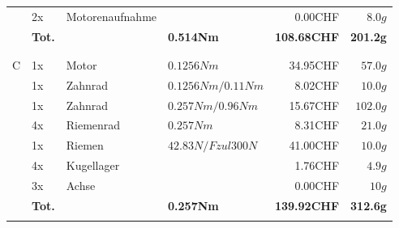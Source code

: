 \begin{longtable}{p{0.5cm}p{0.8cm}lp{3cm}rr}
          & 2x    & Motorenaufnahme &                      & 0.00CHF  & $8.0 g$  \\
          & \textbf{Tot.} &       & \textbf{0.514Nm} & \textbf{108.68CHF} & \textbf{201.2g} \\
          &       &                 &                      &          &  \\
          &       &                 &                      &          &  \\
        \multirow{8}[2]{*}{C} 
          & 1x    & Motor           & $0.1256 Nm$          & 34.95CHF & $57.0 g$ \\
          & 1x    & Zahnrad         & $0.1256 Nm / 0.11 Nm$& 8.02CHF  & $10.0 g$ \\
          & 1x    & Zahnrad         & $0.257 Nm / 0.96 Nm$ & 15.67CHF & $102.0 g$ \\
          & 4x    & Riemenrad       & $0.257 Nm$           & 8.31CHF  & $21.0 g$ \\
          & 1x    & Riemen          & $42.83 N /Fzul 300 N $ & 41.00CHF & $10.0 g$ \\
          & 4x    & Kugellager      &                      & 1.76CHF  & $4.9 g$ \\
          & 3x    & Achse           &                      & 0.00CHF  & $10 g$ \\
          & \textbf{Tot.} &       & \textbf{0.257Nm} & \textbf{139.92CHF} & \textbf{312.6g} \\
          &       &                 &                      &          &  \\       
    \end{longtable}